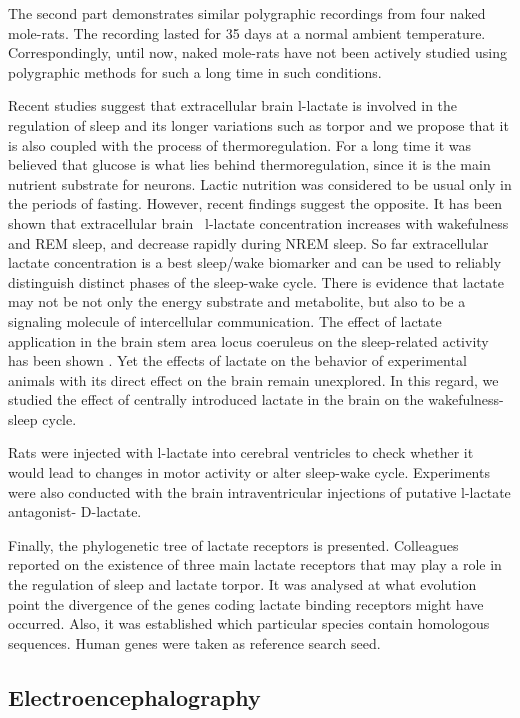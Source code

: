\documentclass[14pt,a4paper]{scrartcl}
\begin{document}
The second part demonstrates similar polygraphic recordings from four naked mole-rats. The recording lasted for 35 days at a normal ambient temperature. Correspondingly, until now, naked mole-rats have not been actively studied using polygraphic methods for such a long time in such conditions.

Recent studies suggest that extracellular brain l-lactate is involved in the regulation of sleep and its longer variations such as torpor \citep{Naylor2012}  and we propose that it is also coupled with the process of thermoregulation. For a long time it was believed that glucose is what lies behind thermoregulation, since it is the main nutrient substrate for neurons. Lactic nutrition was considered to be usual only in the periods of fasting. However, recent findings suggest the opposite. It has been shown that extracellular brain  l-lactate concentration increases with wakefulness and REM sleep, and decrease rapidly during NREM sleep. So far extracellular lactate concentration is a best sleep/wake biomarker and can be used to reliably distinguish distinct phases of the sleep-wake cycle. There is evidence that lactate may not be not only the energy substrate and metabolite, but also to be a signaling molecule of intercellular communication. The effect of lactate application in the brain stem area locus coeruleus on the sleep-related activity has been shown \citep{Tang2014}. Yet the effects of lactate on the behavior of experimental animals with its direct effect on the brain remain unexplored. In this regard, we studied the effect of centrally introduced lactate in the brain on the wakefulness-sleep cycle.

Rats were injected with l-lactate into cerebral ventricles to check whether it would lead to changes in motor activity or alter sleep-wake cycle. Experiments were also conducted with the brain intraventricular injections of putative l-lactate antagonist- D-lactate.

Finally, the phylogenetic tree of lactate receptors is presented. Colleagues reported on the existence of three main lactate receptors that may play a role in the regulation of sleep and lactate torpor. It was analysed at what evolution point the divergence of the genes coding lactate binding receptors might have occurred. Also, it was established which particular species contain homologous sequences. Human genes were taken as reference search seed.

\subsection{Electroencephalography}
\label{sec:Introduction:Electroencephalography}
\end{document}

